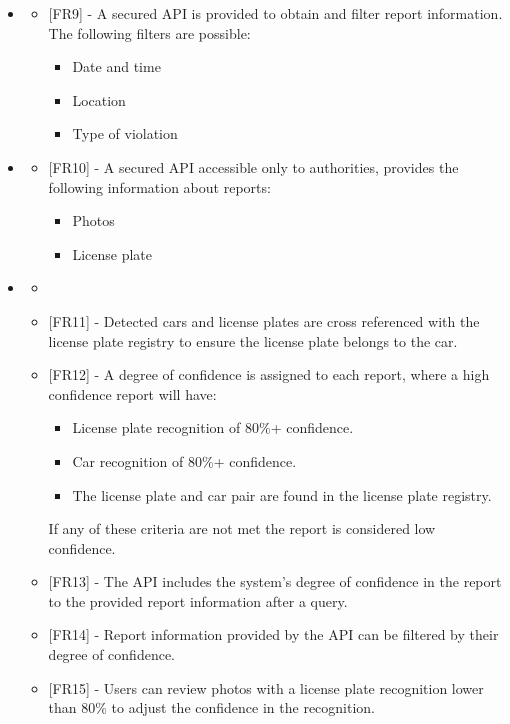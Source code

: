 \begin{itemize}[label={}]
\begin{itemize}[label={}]
    \end{itemize}

\item \textbf{\goalQueryInfo}
    \begin{itemize}[label={}]
        \item {[FR9]} - A secured API is provided to obtain and filter report information. The following filters are possible:
        \begin{itemize}[label={\textbullet}]
            \item Date and time
            \item Location
            \item Type of violation
        \end{itemize}
    \end{itemize}

\item \textbf{\goalPhotosAuthoritiesOnly}
    \begin{itemize}[label={}]
        \item {[FR10]} - A secured API accessible only to authorities, provides the following information about reports:
        \begin{itemize}[label={\textbullet}]
            \item Photos
            \item License plate
        \end{itemize}
    \end{itemize}

\item \textbf{\goalCuratedReports}
    \begin{itemize}[label={}]
        \item \assumptionLicensePlateRegistry
        \item {[FR11]} - Detected cars and license plates are cross referenced with the license plate registry to ensure the license plate belongs to the car.
        \item {[FR12]} - A degree of confidence is assigned to each report, where a high confidence report will have:
        \begin{itemize}[label={\textbullet}]
            \item License plate recognition of 80\%+ confidence.
            \item Car recognition of 80\%+ confidence.
            \item The license plate and car pair are found in the license plate registry.
        \end{itemize}
        If any of these criteria are not met the report is considered low confidence.
        \item {[FR13]} - The API includes the system’s degree of confidence in the report to the provided report information after a query.
        \item {[FR14]} - Report information provided by the API can be filtered by their degree of confidence.
        \item {[FR15]} - Users can review photos with a license plate recognition lower than 80\% to adjust the confidence in the recognition.
    \end{itemize}


\end{itemize}
